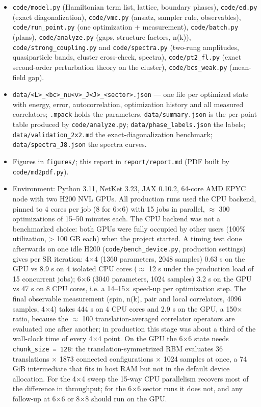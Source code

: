 \documentclass[10pt]{article}
\begin{document}
\begin{itemize}
\item \texttt{code/model.py} (Hamiltonian term list, lattice, boundary phases), \texttt{code/ed.py} (exact diagonalization),
\texttt{code/vmc.py} (ansatz, sampler rule, observables), \texttt{code/run\_point.py} (one optimization + measurement),
\texttt{code/batch.py} (plans), \texttt{code/analyze.py} (gaps, structure factors, n(k)), \texttt{code/strong\_coupling.py} and
\texttt{code/spectra.py} (two-rung amplitudes, quasiparticle bands, cluster cross-check, spectra),
\texttt{code/pt2\_fl.py} (exact second-order perturbation theory on the cluster), \texttt{code/bcs\_weak.py} (mean-field gap).
\item \texttt{data/<L>\_<bc>\_nu<ν>\_J<J>\_<sector>.json} --- one file per optimized state with energy, error, autocorrelation,
optimization history and all measured correlators; \texttt{.mpack} holds the parameters. \texttt{data/summary.json} is the
per-point table produced by \texttt{code/analyze.py}; \texttt{data/phase\_labels.json} the labels; \texttt{data/validation\_2x2.md}
the exact-diagonalization benchmark; \texttt{data/spectra\_J8.json} the spectra curves.
\item Figures in \texttt{figures/}; this report in \texttt{report/report.md} (PDF built by \texttt{code/md2pdf.py}).
\item Environment: Python 3.11, NetKet 3.23, JAX 0.10.2, 64-core AMD EPYC node with two H200 NVL GPUs. All production
runs used the CPU backend, pinned to 4 cores per job (8 for 6$\times$6) with 15 jobs in parallel, $\approx$ 300 optimizations of
15--50 minutes each. The CPU backend was not a benchmarked choice: both GPUs were fully occupied by other users
(100\% utilization, > 100 GB each) when the project started. A timing test done afterwards on one idle H200
(\texttt{code/bench\_device.py}, production settings) gives per SR iteration: 4$\times$4 (1360 parameters, 2048 samples)
0.63 s on the GPU vs 8.9 s on 4 isolated CPU cores ($\approx$ 12 s under the production load of 15 concurrent jobs);
6$\times$6 (3040 parameters, 1024 samples) 3.2 s on the GPU vs 47 s on 8 CPU cores, i.e. a 14--15$\times$ speed-up per
optimization step. The final observable measurement (spin, n(k), pair and local correlators, 4096 samples,
4$\times$4) takes 444 s on 4 CPU cores and 2.9 s on the GPU, a 150$\times$ ratio, because the $\approx$ 100 translation-averaged
correlator operators are evaluated one after another; in production this stage was about a third of the
wall-clock time of every 4$\times$4 point. On the GPU the 6$\times$6 state needs \texttt{chunk\_size = 128}: the
translation-symmetrized RBM evaluates 36 translations $\times$ 1873 connected configurations $\times$ 1024 samples at once,
a 74 GiB intermediate that fits in host RAM but not in the default device allocation. For the 4$\times$4 sweep the
15-way CPU parallelism recovers most of the difference in throughput; for the 6$\times$6 sector runs it does not,
and any follow-up at 6$\times$6 or 8$\times$8 should run on the GPU.
\end{itemize}
\end{document}
